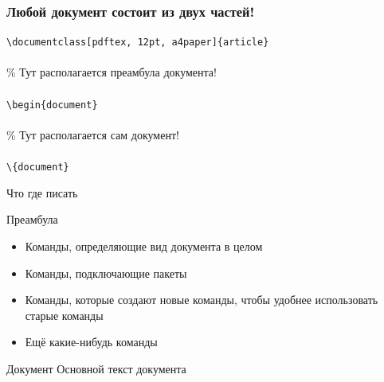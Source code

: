 \documentclass[newPxFont]{beamer}
\begin{document}
\begin{frame}[fragile]
\frametitle{Любой документ состоит из двух частей!} 
\begin{mdframed}[backgroundcolor=LTXLightGreen] 
\verb|\documentclass[pdftex, 12pt, a4paper]{article}|\\
\\
\% Тут располагается преамбула документа!\\
\\
\verb|\begin{document}|\\
\\
\% Тут располагается сам документ!\\
\\
\verb|\{document}|\\
\end{mdframed}    
\end{frame}


\begin{frame}{Что где писать}
\begin{block}{Преамбула}
\begin{itemize}
\item Команды, определяющие вид документа в целом
\item Команды, подключающие пакеты
\item Команды, которые создают новые команды, чтобы удобнее использовать старые команды
\item Ещё какие-нибудь команды
\end{itemize}
\end{block}

\begin{block}{Документ}
Основной текст документа
\end{block}
\end{frame}
\end{document}
